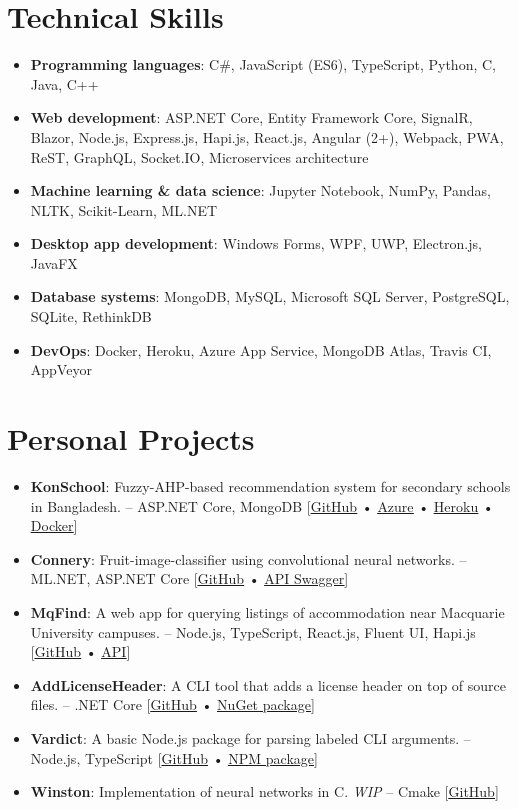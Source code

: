 \documentclass[letter-paper,10pt]{article}
\newcommand{\resumeItem}[2]{
  \item\small{
    \textbf{#1}{: #2 \vspace{-2pt}}
  }
}
\newcommand{\resumeSubItem}[2]{\resumeItem{#1}{#2}\vspace{-3pt}}
\newcommand{\resumeSubHeadingListStart}{\begin{itemize}[leftmargin=*]}
\newcommand{\resumeSubHeadingListEnd}{\end{itemize}}
\begin{document}
\section{Technical Skills}
  \resumeSubHeadingListStart
    \resumeSubItem{Programming languages}
      {C\#, JavaScript (ES6), TypeScript, Python, C, Java, C++}
    \resumeSubItem{Web development}
      {ASP.NET Core, Entity Framework Core, SignalR, Blazor, Node.js, Express.js, Hapi.js, React.js, Angular (2+), Webpack, PWA, ReST, GraphQL, Socket.IO, Microservices architecture}
    \resumeSubItem{Machine learning \& data science}
      {Jupyter Notebook, NumPy, Pandas, NLTK, Scikit-Learn, ML.NET}
    \resumeSubItem{Desktop app development}
      {Windows Forms, WPF, UWP, Electron.js, JavaFX}
    \resumeSubItem{Database systems}
      {MongoDB, MySQL, Microsoft SQL Server, PostgreSQL, SQLite, RethinkDB}
    \resumeSubItem{DevOps}
      {Docker, Heroku, Azure App Service, MongoDB Atlas, Travis CI, AppVeyor}
  \resumeSubHeadingListEnd

\vspace{-3pt}

\section{Personal Projects}
  \resumeSubHeadingListStart
    \resumeSubItem{KonSchool}
      {Fuzzy-AHP-based recommendation system for secondary schools in Bangladesh. -- ASP.NET Core, MongoDB [\href{https://github.com/maacpiash/KonSchool}{\underline{GitHub}} • \href{https://konschool.azurewebsites.net/}{\underline{Azure}} • \href{https://konschool.herokuapp.com}{\underline{Heroku}} • \href{https://hub.docker.com/r/maacpiash/konschool}{\underline{Docker}}]}
    \resumeSubItem{Connery}
      {Fruit-image-classifier using convolutional neural networks. -- ML.NET, ASP.NET Core [\href{https://github.com/maacpiash/Connery}{\underline{GitHub}} • \href{https://connery-api.herokuapp.com}{\underline{API Swagger}}]}
    \resumeSubItem{MqFind}
      {A web app for querying listings of accommodation near Macquarie University campuses. -- Node.js, TypeScript, React.js, Fluent UI, Hapi.js [\href{https://github.com/maacpiash/MqFind}{\underline{GitHub}} • \href{https://mqfind-api.herokuapp.com}{\underline{API}}]}
    \resumeSubItem{AddLicenseHeader}
      {A CLI tool that adds a license header on top of source files. -- .NET Core [\href{https://github.com/maacpiash/addlh}{\underline{GitHub}} • \href{https://www.nuget.org/packages/AddLicenseHeader}{\underline{NuGet package}}]}
    \resumeSubItem{Vardict}
      {A basic Node.js package for parsing labeled CLI arguments. -- Node.js, TypeScript [\href{https://github.com/maacpiash/vardict}{\underline{GitHub}} • \href{https://www.npmjs.com/package/vardict/}{\underline{NPM package}}]}
    \resumeSubItem{Winston}
      {Implementation of neural networks in C. \textit{WIP} -- Cmake [\href{https://github.com/maacpiash/Winston}{\underline{GitHub}}]}
  \resumeSubHeadingListEnd
  
\end{document}
